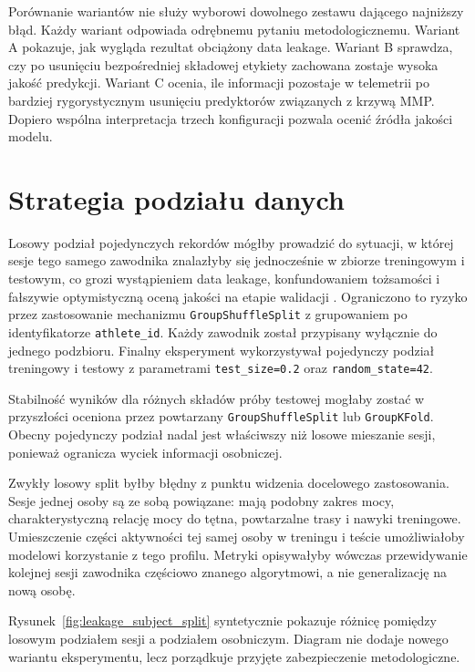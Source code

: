 Porównanie wariantów nie służy wyborowi dowolnego zestawu dającego najniższy błąd. Każdy wariant odpowiada odrębnemu pytaniu metodologicznemu. Wariant A pokazuje, jak wygląda rezultat obciążony data leakage. Wariant B sprawdza, czy po usunięciu bezpośredniej składowej etykiety zachowana zostaje wysoka jakość predykcji. Wariant C ocenia, ile informacji pozostaje w telemetrii po bardziej rygorystycznym usunięciu predyktorów związanych z krzywą MMP. Dopiero wspólna interpretacja trzech konfiguracji pozwala ocenić źródła jakości modelu.

\section{Strategia podziału danych}

Losowy podział pojedynczych rekordów mógłby prowadzić do sytuacji, w której sesje tego samego zawodnika znalazłyby się jednocześnie w zbiorze treningowym i testowym, co grozi wystąpieniem data leakage, konfundowaniem tożsamości i fałszywie optymistyczną oceną jakości na etapie walidacji \parencite{kohavi1995cv,saeb2017useCase,chaibubNeto2019identity,tougui2021crossValidation,rosenblatt2024leakage,richter2021sportsMl}. Ograniczono to ryzyko przez zastosowanie mechanizmu \texttt{GroupShuffleSplit} \parencite{sklearn_groupkfold} z grupowaniem po identyfikatorze \texttt{athlete\_id}. Każdy zawodnik został przypisany wyłącznie do jednego podzbioru. Finalny eksperyment wykorzystywał pojedynczy podział treningowy i testowy z parametrami \texttt{test\_size=0.2} oraz \texttt{random\_state=42}.

Stabilność wyników dla różnych składów próby testowej mogłaby zostać w przyszłości oceniona przez powtarzany \texttt{GroupShuffleSplit} lub \texttt{GroupKFold}. Obecny pojedynczy podział nadal jest właściwszy niż losowe mieszanie sesji, ponieważ ogranicza wyciek informacji osobniczej.

Zwykły losowy split byłby błędny z punktu widzenia docelowego zastosowania. Sesje jednej osoby są ze sobą powiązane: mają podobny zakres mocy, charakterystyczną relację mocy do tętna, powtarzalne trasy i nawyki treningowe. Umieszczenie części aktywności tej samej osoby w treningu i teście umożliwiałoby modelowi korzystanie z tego profilu. Metryki opisywałyby wówczas przewidywanie kolejnej sesji zawodnika częściowo znanego algorytmowi, a nie generalizację na nową osobę.

Rysunek~\ref{fig:leakage_subject_split} syntetycznie pokazuje różnicę pomiędzy losowym podziałem sesji a podziałem osobniczym. Diagram nie dodaje nowego wariantu eksperymentu, lecz porządkuje przyjęte zabezpieczenie metodologiczne.

